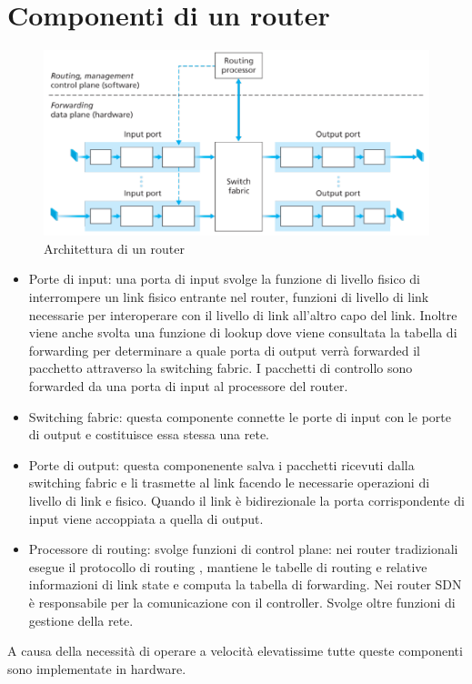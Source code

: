 \section{Componenti di un router}
\begin{figure}[h]
\includegraphics[width=\textwidth]{Router.png}
\caption{Architettura di un router}
\end{figure}
\begin{itemize}
\item Porte di input: una porta di input svolge la funzione di livello fisico di interrompere un link fisico entrante nel router, funzioni di livello di 
link necessarie per interoperare con il livello di link all'altro capo del link. Inoltre viene anche svolta una funzione di lookup dove viene consultata la 
tabella di forwarding per determinare a quale porta di output verr\`a forwarded il pacchetto attraverso la switching fabric. I pacchetti di controllo sono
forwarded da una porta di input al processore del router.
\item Switching fabric: questa componente connette le porte di input con le porte di output e costituisce essa stessa una rete. 
\item Porte di output: questa componenente salva i pacchetti ricevuti dalla switching fabric e li trasmette al link facendo le necessarie operazioni 
di livello di link e fisico. Quando il link \`e bidirezionale la porta corrispondente di input viene accoppiata a quella di output. 
\item Processore di routing: svolge funzioni di control plane: nei router tradizionali esegue il protocollo di routing , mantiene le tabelle di routing e 
relative informazioni di link state e computa la tabella di forwarding. Nei router SDN \`e responsabile per la comunicazione con il controller. Svolge oltre
funzioni di gestione della rete.
\end{itemize}
A causa della necessit\`a di operare a velocit\`a elevatissime tutte queste componenti sono implementate in hardware.
